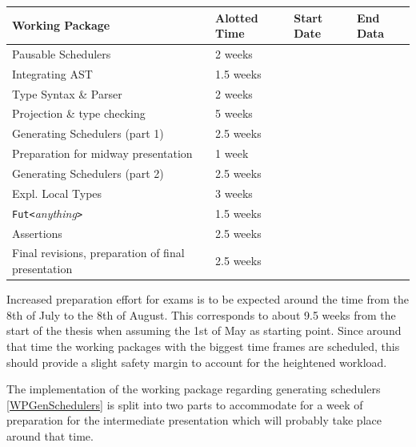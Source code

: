 \documentclass[paper=a4,nochapname,accentcolor=tud9c]{tudexercise}
\begin{document}
\begin{tabular}{llll}
Working Package & Alotted Time & Start Date & End Data \\
\hline
Pausable Schedulers & 2 weeks & & \\
Integrating AST & 1.5 weeks & & \\
Type Syntax \& Parser & 2 weeks & & \\
Projection \& type checking & 5 weeks & & \\
Generating Schedulers (part 1) & 2.5 weeks & & \\
Preparation for midway presentation & 1 week & & \\
Generating Schedulers (part 2) & 2.5 weeks & & \\
Expl. Local Types & 3 weeks & & \\
\texttt{Fut<}\emph{anything}\texttt{>} & 1.5 weeks & & \\
Assertions & 2.5 weeks & & \\
Final revisions, preparation of final presentation & 2.5 weeks & &
\end{tabular}

\medskip

Increased preparation effort for exams is to be expected around the time from
the 8th of July to the 8th of August. This corresponds to about 9.5 weeks from the
start of the thesis when assuming the 1st of May as starting point.
Since around that time the working packages with the biggest time frames are
scheduled, this should provide a slight safety margin to account for the
heightened workload.

The implementation of the working package regarding generating schedulers
\ref{WPGenSchedulers} is split into two parts to accommodate for a week of
preparation for the intermediate presentation which will probably take place
around that time.

\printbibliography[heading=bibnumbered]
\end{document}
